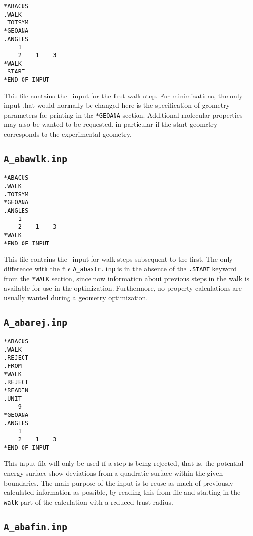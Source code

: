 \begin{verbatim}
*ABACUS
.WALK
.TOTSYM
*GEOANA
.ANGLES
    1
    2    1    3
*WALK
.START
*END OF INPUT
\end{verbatim}

This file contains the \aba\ input for the first walk step.  For
minimizations, the only input that would normally be changed here
is the specification of geometry parameters for printing in the
\verb|*GEOANA| section. Additional molecular properties may also be
wanted to be requested, in particular if the start geometry
corresponds to the experimental geometry.

\subsection{{\tt A\_abawlk.inp}}

\begin{verbatim}
*ABACUS
.WALK
.TOTSYM
*GEOANA
.ANGLES
    1
    2    1    3
*WALK
*END OF INPUT
\end{verbatim}

This file contains the \aba\ input for walk steps subsequent to
the first.  The only difference with the file \verb|A_abastr.inp|
is in the absence of the \verb|.START| keyword from the
\verb|*WALK| section, since now information about previous steps
in the walk is available for use in the optimization. Furthermore, no
property calculations are usually wanted during a geometry optimization.


\subsection{{\tt A\_abarej.inp}}

\begin{verbatim}
*ABACUS
.WALK
.REJECT
.FROM
*WALK
.REJECT
*READIN
.UNIT
    9
*GEOANA
.ANGLES
    1
    2    1    3
*END OF INPUT
\end{verbatim}

This input file will only be used if a step is being rejected, that
is, the potential energy surface show deviations from a quadratic
surface within the given boundaries. The main purpose of the input is
to reuse as much of previously calculated information as possible, by
reading this from file and starting in the \verb|walk|-part of the
calculation with a reduced trust radius.

\subsection{{\tt A\_abafin.inp}}

